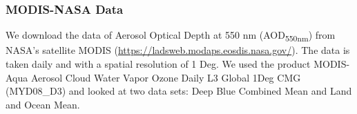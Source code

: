 \subsubsection{MODIS-NASA Data}
We download the data of Aerosol Optical Depth at 550 nm (AOD\textsubscript{550nm}) from NASA’s satellite MODIS (\url{https://ladsweb.modaps.eosdis.nasa.gov/}). The data is taken daily and with a spatial resolution of 1 Deg. We used the product MODIS-Aqua Aerosol Cloud Water Vapor Ozone Daily L3 Global 1Deg CMG (MYD08\_D3) and looked at two data sets: Deep Blue Combined Mean and Land and Ocean Mean.